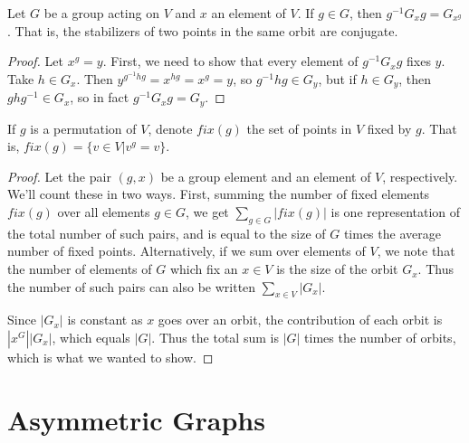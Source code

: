 \begin{lemma}
{Let $G$ be a group acting on $V$ and $x$ an element of $V$.  If $g\in G$, then $g^{-1}G_xg=G_{x^g}$.  That is, the stabilizers of two points in the same orbit are conjugate.}
\end{lemma}
\begin{proof}
	
	Let $x^g=y$.  First, we need to show that every element of $g^{-1}G_xg$ fixes $y$.  Take $h\in G_x$.  Then $y^{g^{-1}hg}=x^{hg}=x^g=y$, so $g^{-1}hg\in G_y$, but if $h\in G_y$, then $ghg^{-1}\in G_x$, so in fact $g^{-1}G_xg=G_y$.
	
	
	
\end{proof}


If $g$ is a permutation of $V$, denote $fix(g)$ the set of points in $V$ fixed by $g$.  That is, $fix(g)=\{v\in V | v^g=v\}$.


\begin{proof}
	
	Let the pair $(g,x)$ be a group element and an element of $V$, respectively.  We'll count these in two ways.  First, summing the number of fixed elements $fix(g)$ over all elements $g\in G$, we get $\sum\limits_{g\in G}|fix(g)|$ is one representation of the total number of such pairs, and is equal to the size of $G$ times the average number of fixed points.  Alternatively, if we sum over elements of $V$, we note that the number of elements of $G$ which fix an $x\in V$ is the size of the orbit $G_x$.  Thus the number of such pairs can also be written $\sum\limits_{x\in V}|G_x|$.
	
	Since $|G_x|$ is constant as $x$ goes over an orbit, the contribution of each orbit is $|x^G||G_x|$, which equals $|G|$.  Thus the total sum is $|G|$ times the number of orbits, which is what we wanted to show.
	
	
\end{proof}






\section*{Asymmetric Graphs}


